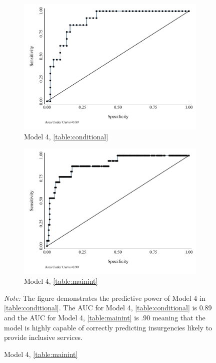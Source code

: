 \documentclass[12pt, letterpaper]{article}
\begin{document}
\newpage
\begin{figure}[h]
\renewcommand\thefigure{A.\arabic{figure}}
\caption{\textbf{ROC Curves of Predicted Accuracy}}
\label{figure:roccurve}
\centering
	\begin{subfigure}{0.45\textwidth}
    \centering
    \caption{Model 4, \autoref{table:conditional}} \label{figure:roccurve1}
    \includegraphics[width=\textwidth]{roccurve1.pdf}
    \end{subfigure}
% 
	\begin{subfigure}{0.45\textwidth}
    \centering
    \caption{Model 4, \autoref{table:mainint}} \label{figure:roccurve2}
    \includegraphics[width=\textwidth]{roccurve2.pdf}
    \end{subfigure}
  \begin{tablenotes}
\raggedright \footnotesize{\textit{Note:} The figure demonstrates the predictive power of Model 4 in  \autoref{table:conditional}. The AUC for Model 4, \autoref{table:conditional} is 0.89 and the AUC for Model 4, \autoref{table:mainint} is .90 meaning that the model is highly capable of correctly predicting insurgencies likely to provide inclusive services.}
\end{tablenotes}
\end{figure}
\end{document}
